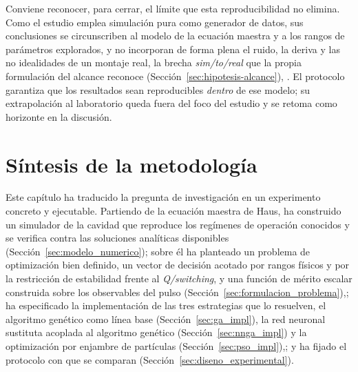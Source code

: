 Conviene reconocer, para cerrar, el límite que esta reproducibilidad no elimina.
Como el estudio emplea simulación pura como generador de datos, sus conclusiones se
circunscriben al modelo de la ecuación maestra y a los rangos de parámetros
explorados, y no incorporan de forma plena el ruido, la deriva y las no idealidades
de un montaje real, la brecha \emph{sim\-/to\-/real} que la propia formulación del
alcance reconoce (Sección~\ref{sec:hipotesis-alcance}), \cite{Zhao2020}. El protocolo
garantiza que los resultados sean reproducibles \emph{dentro} de ese modelo; su
extrapolación al laboratorio queda fuera del foco del estudio y se retoma como
horizonte en la discusión.



\section{Síntesis de la metodología}
\label{sec:sintesis_metodologia}

Este capítulo ha traducido la pregunta de investigación en un experimento concreto y
ejecutable. Partiendo de la ecuación maestra de Haus, ha construido un simulador de
la cavidad que reproduce los regímenes de operación conocidos y se verifica contra
las soluciones analíticas disponibles (Sección~\ref{sec:modelo_numerico}); sobre él
ha planteado un problema de optimización bien definido, un vector de decisión acotado
por rangos físicos y por la restricción de estabilidad frente al \emph{Q\-/switching},
y una función de mérito escalar construida sobre los observables del pulso
(Sección~\ref{sec:formulacion_problema}),; ha especificado la implementación de las
tres estrategias que lo resuelven, el algoritmo genético como línea base
(Sección~\ref{sec:ga_impl}), la red neuronal sustituta acoplada al algoritmo genético
(Sección~\ref{sec:nnga_impl}) y la optimización por enjambre de partículas
(Sección~\ref{sec:pso_impl}),; y ha fijado el protocolo con que se comparan
(Sección~\ref{sec:diseno_experimental}).

